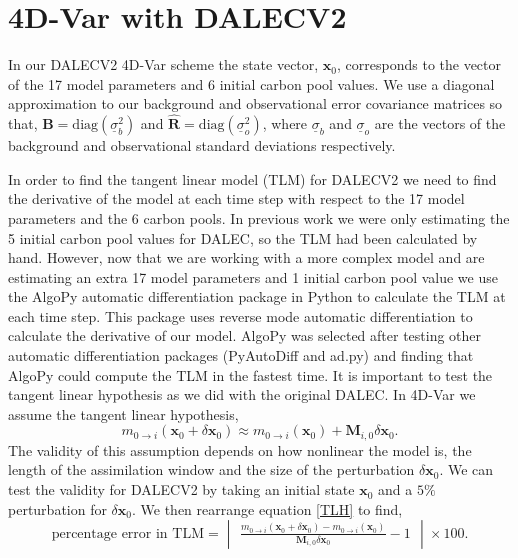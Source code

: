 \documentclass[11pt]{article}
\begin{document}
\section{4D-Var with DALECV2} \label{sec:4dvardalec}

In our DALECV2 4D-Var scheme the state vector, $\textbf{x}_0$, corresponds to the vector of the 17 model parameters and 6 initial carbon pool values. We use a diagonal approximation to our background and observational error covariance matrices so that, 
$\textbf{B}=\text{diag}(\underline{\sigma}_b^2)$ and $\hat{\textbf{R}}=\text{diag}(\underline{\sigma}_o^2 )$,
where $\underline{\sigma}_b$ and $\underline{\sigma}_o$ are the vectors of the background and observational standard deviations respectively.

In order to find the tangent linear model (TLM) for DALECV2 we need to find the derivative of the model at each time step with respect to the 17 model parameters and the 6 carbon pools. In previous work we were only estimating the 5 initial carbon pool values for DALEC, so the TLM had been calculated by hand. However, now that we are working with a more complex model and are estimating an extra 17 model parameters and 1 initial carbon pool value we use the AlgoPy automatic differentiation package in Python to calculate the TLM at each time step. This package uses reverse mode automatic differentiation to calculate the derivative of our model. AlgoPy was selected after testing other automatic differentiation packages (PyAutoDiff and ad.py) and finding that AlgoPy could compute the TLM in the fastest time. It is important to test the tangent linear hypothesis as we did with the original DALEC. In 4D-Var we assume the tangent linear hypothesis,
\begin{equation}
m_{0\rightarrow i}(\mathbf{x}_0+\delta\mathbf{x}_0) \approx m_{0 \rightarrow i}(\mathbf{x}_0) + \mathbf{M}_{i,0}\delta\mathbf{x}_0. \label{TLH}
\end{equation}
The validity of this assumption depends on how nonlinear the model is, the length of the assimilation window and the size of the perturbation $\delta\mathbf{x}_0$. We can test the validity for DALECV2 by taking an initial state $\mathbf{x}_0$ and a $5\%$ perturbation for $\delta\mathbf{x}_0$. We then rearrange equation \ref{TLH} to find, 
\begin{equation}
\text{percentage error in TLM} = \begin{vmatrix} \frac{m_{0\rightarrow i}(\mathbf{x}_0+\delta\mathbf{x}_0) - m_{0 \rightarrow i}(\mathbf{x}_0)}{ \mathbf{M}_{i,0}\delta\mathbf{x}_0} - 1 \end{vmatrix} \times 100.
\end{equation}
\end{document}
